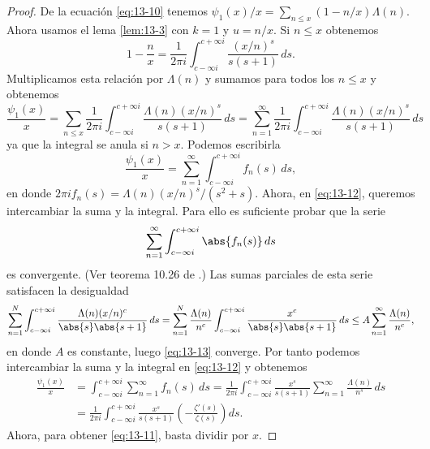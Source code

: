     \begin{proof}
        De la ecuación \eqref{eq:13-10} tenemos $\psi_1(x)/x=\sum_{n\leq x}(1-n/x)\Lambda(n)$.
        Ahora usamos el lema \ref{lem:13-3} con $k=1$ y $u=n/x$. Si $n\leq x$ obtenemos
        \begin{equation*}
            1-\frac{n}{x}=\frac{1}{2\pi i}\int_{c-\infty i}^{c+\infty i}\frac{(x/n)^s}{s(s+1)}\,ds.
        \end{equation*}
        Multiplicamos esta relación por $\Lambda(n)$ y sumamos para todos los $n\leq x$ y
        obtenemos
        \begin{equation*}
            \frac{\psi_1(x)}{x}=\sum_{n\leq x}\frac{1}{2\pi i}\int_{c-\infty i}^{c+\infty i}\frac{\Lambda(n)(x/n)^s}{s(s+1)}\,ds=\sum_{n=1}^{\infty}\frac{1}{2\pi i}\int_{c-\infty i}^{c+\infty i}\frac{\Lambda(n)(x/n)^s}{s(s+1)}\,ds
        \end{equation*}
        ya que la integral se anula si $n>x$. Podemos escribirla
        \begin{equation}\label{eq:13-12}
            \frac{\psi_1(x)}{x}=\sum_{n=1}^{\infty}\int_{c-\infty i}^{c+\infty i}f_n(s)\,ds,
        \end{equation}
        en donde $2\pi if_n(s)=\Lambda(n)(x/n)^s/(s^2+s)$. Ahora, en \eqref{eq:13-12}, queremos
        intercambiar la suma y la integral. Para ello es suficiente probar que la serie
        \begin{equation}\label{eq:13-13}
            \sum_{n=1}^{\infty}\int_{c-\infty i}^{c+\infty i}\abs{f_n(s)}\,ds
        \end{equation}
        es convergente. (Ver teorema 10.26 de \cite{apostol1976}.) Las sumas parciales de esta
        serie satisfacen la desigualdad
        \begin{equation*}
            \sum_{n=1}^{N}\int_{c-\infty i}^{c+\infty i}\frac{\Lambda(n)(x/n)^c}{\abs{s}\abs{s+1}}\,ds=\sum_{n=1}^{N}\frac{\Lambda(n)}{n^c}\int_{c-\infty i}^{c+\infty i}\frac{x^c}{\abs{s}\abs{s+1}}\,ds\leq A\sum_{n=1}^{\infty}\frac{\Lambda(n)}{n^c},
        \end{equation*}
        en donde $A$ es constante, luego \eqref{eq:13-13} converge. Por tanto podemos
        intercambiar la suma y la integral en \eqref{eq:13-12} y obtenemos
        \begin{align*}
            \frac{\psi_1(x)}{x}&=\int_{c-\infty i}^{c+\infty i}\sum_{n=1}^{\infty}f_n(s)\,ds=\frac{1}{2\pi i}\int_{c-\infty i}^{c+\infty i}\frac{x^s}{s(s+1)}\sum_{n=1}^{\infty}\frac{\Lambda(n)}{n^s}\,ds\\
            &=\frac{1}{2\pi i}\int_{c-\infty i}^{c+\infty i}\frac{x^s}{s(s+1)}\left(-\frac{\zeta'(s)}{\zeta(s)}\right)ds.
        \end{align*}
        Ahora, para obtener \eqref{eq:13-11}, basta dividir por $x$.
    \end{proof}

